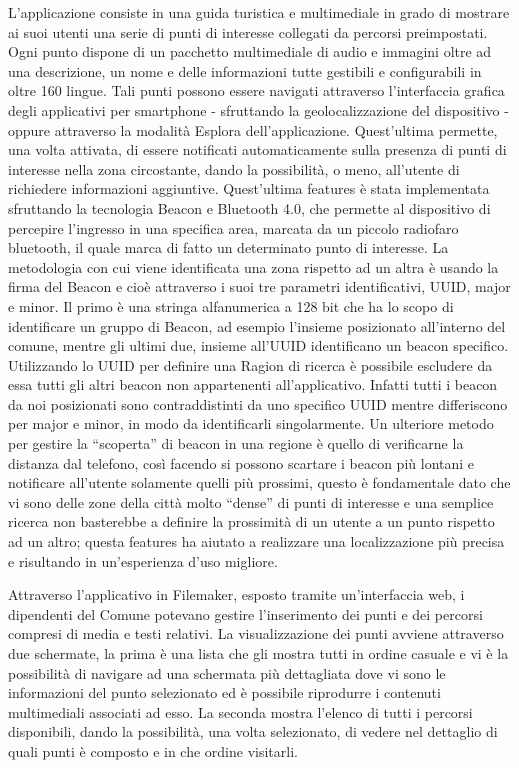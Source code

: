L’applicazione consiste in una guida turistica e multimediale in grado di mostrare ai suoi utenti una serie di punti di interesse collegati da percorsi preimpostati. Ogni punto dispone di un pacchetto multimediale di audio e immagini oltre ad una descrizione, un nome e delle informazioni tutte gestibili e configurabili in oltre 160 lingue. Tali punti possono essere navigati attraverso l’interfaccia grafica degli applicativi per smartphone - sfruttando la geolocalizzazione del dispositivo - oppure attraverso la modalità Esplora dell’applicazione. Quest'ultima permette, una volta attivata, di essere notificati automaticamente sulla presenza di punti di interesse nella zona circostante, dando la possibilità, o meno, all’utente di richiedere informazioni aggiuntive. Quest’ultima features è stata implementata sfruttando la tecnologia Beacon e Bluetooth 4.0, che permette al dispositivo di percepire l’ingresso in una specifica area, marcata da un piccolo radiofaro bluetooth, il quale marca di fatto un determinato punto di interesse. La metodologia con cui viene identificata una zona rispetto ad un altra è usando la firma del Beacon e cioè attraverso i suoi tre parametri identificativi, UUID, major e minor. Il primo è una stringa alfanumerica a 128 bit che ha lo scopo di identificare un gruppo di Beacon, ad esempio l’insieme posizionato all’interno del comune, mentre gli ultimi due, insieme all’UUID identificano un beacon specifico. Utilizzando lo UUID per definire una Ragion di ricerca è possibile escludere da essa tutti gli altri beacon non appartenenti all’applicativo. Infatti tutti i beacon da noi posizionati sono contraddistinti da uno specifico UUID mentre differiscono per major e minor, in modo da identificarli singolarmente. Un ulteriore metodo per gestire la “scoperta” di beacon in una regione è quello di verificarne la distanza dal telefono, così facendo si possono scartare i beacon più lontani e notificare all’utente solamente quelli più prossimi, questo è fondamentale dato che vi sono delle zone della città molto “dense” di punti di interesse e una semplice ricerca non basterebbe a definire la prossimità di un utente a un punto rispetto ad un altro; questa features ha aiutato a realizzare una localizzazione più precisa e risultando in un’esperienza d’uso migliore.\vspace{5mm}

	Attraverso l’applicativo in Filemaker, esposto tramite un’interfaccia web, i dipendenti del Comune potevano gestire l’inserimento dei punti e dei percorsi compresi di media e testi relativi. \vspace{5mm}
La visualizzazione dei punti avviene attraverso due schermate, la prima è una lista che gli mostra tutti in ordine casuale e vi è la possibilità di navigare ad una schermata più dettagliata dove vi sono le informazioni del punto selezionato ed è possibile riprodurre i contenuti multimediali associati ad esso. La seconda mostra l'elenco di tutti i percorsi disponibili, dando la possibilità, una volta selezionato, di vedere nel dettaglio di quali punti è composto e in che ordine visitarli.
	
